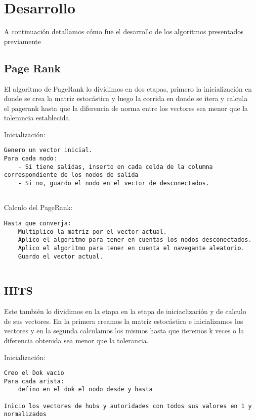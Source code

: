 \section{Desarrollo}

A continuación detallamos cómo fue el desarrollo de los algoritmos presentados previamente

\subsection{Page Rank}
El algoritmo de PageRank lo dividimos en dos etapas, primero la inicializaci\'on en donde se crea la matriz estoc\'astica y luego la corrida en donde se itera y calcula el pagerank hasta que la diferencia de norma entre los vectores sea menor que la tolerancia establecida.

Inicializaci\'on:
\begin{lstlisting}[frame=single]  
Genero un vector inicial.
Para cada nodo:
	- Si tiene salidas, inserto en cada celda de la columna correspondiente de los nodos de salida
	- Si no, guardo el nodo en el vector de desconectados.
	
\end{lstlisting}

Calculo del PageRank:
\begin{lstlisting}[frame=single] 
Hasta que converja:
	Multiplico la matriz por el vector actual.
	Aplico el algoritmo para tener en cuentas los nodos desconectados.
	Aplico el algoritmo para tener en cuenta el navegante aleatorio.
	Guardo el vector actual.
	
\end{lstlisting}


\subsection{HITS}
Este también lo dividimos en la etapa en la etapa de iniciaclización y de calculo de sus vectores. En la primera creamos la matriz estocástica e inicializamos los vectores y en la segunda calculamos los mismos hasta que iteremos k veces o la diferencia obtenida sea menor que la tolerancia.

Inicializaci\'on:
\begin{lstlisting}[frame=single]  
Creo el Dok vacio
Para cada arista:
	defino en el dok el nodo desde y hasta
	
Inicio los vectores de hubs y autoridades con todos sus valores en 1 y normalizados
	
\end{lstlisting}

